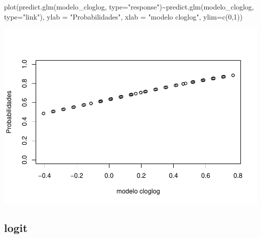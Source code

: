 \documentclass[
]{article}
\newenvironment{Shaded}{\begin{snugshade}}{\end{snugshade}}
\newcommand{\AttributeTok}[1]{\textcolor[rgb]{0.77,0.63,0.00}{#1}}
\newcommand{\DecValTok}[1]{\textcolor[rgb]{0.00,0.00,0.81}{#1}}
\newcommand{\FunctionTok}[1]{\textcolor[rgb]{0.00,0.00,0.00}{#1}}
\newcommand{\NormalTok}[1]{#1}
\newcommand{\OtherTok}[1]{\textcolor[rgb]{0.56,0.35,0.01}{#1}}
\newcommand{\SpecialCharTok}[1]{\textcolor[rgb]{0.00,0.00,0.00}{#1}}
\newcommand{\StringTok}[1]{\textcolor[rgb]{0.31,0.60,0.02}{#1}}
\begin{document}
\begin{Shaded}
\begin{Highlighting}[]
\FunctionTok{plot}\NormalTok{(}\FunctionTok{predict.glm}\NormalTok{(modelo\_cloglog, }\AttributeTok{type=}\StringTok{"response"}\NormalTok{)}\SpecialCharTok{\textasciitilde{}}\FunctionTok{predict.glm}\NormalTok{(modelo\_cloglog, }\AttributeTok{type=}\StringTok{"link"}\NormalTok{),}
     \AttributeTok{ylab =} \StringTok{"Probabilidades"}\NormalTok{,}
     \AttributeTok{xlab =}  \StringTok{"modelo cloglog"}\NormalTok{,}
     \AttributeTok{ylim=}\FunctionTok{c}\NormalTok{(}\DecValTok{0}\NormalTok{,}\DecValTok{1}\NormalTok{))}
\end{Highlighting}
\end{Shaded}

\includegraphics{EDA__files/figure-latex/unnamed-chunk-9-2.pdf}

\hypertarget{logit}{%
\subsection{logit}\label{logit}}

\begin{Shaded}
\end{Shaded}
\end{document}
